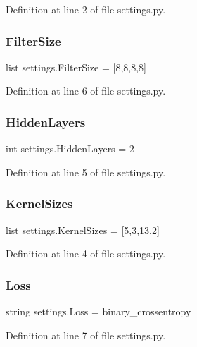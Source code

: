 Definition at line 2 of file settings.\+py.

\mbox{\label{namespacesettings_ad32069497b7acd7e985c078d77f29cea}} 
\subsubsection{Filter\+Size}
{\footnotesize\ttfamily list settings.\+Filter\+Size = [8,8,8,8]}



Definition at line 6 of file settings.\+py.

\mbox{\label{namespacesettings_a7ab30b36eb4de4ee4d8bd3d762061d03}} 
\subsubsection{Hidden\+Layers}
{\footnotesize\ttfamily int settings.\+Hidden\+Layers = 2}



Definition at line 5 of file settings.\+py.

\mbox{\label{namespacesettings_a08ce7efcff1b67c3adc53a438a6c20e0}} 
\subsubsection{Kernel\+Sizes}
{\footnotesize\ttfamily list settings.\+Kernel\+Sizes = [5,3,13,2]}



Definition at line 4 of file settings.\+py.

\mbox{\label{namespacesettings_a7a8c06359c925c3df63368c34df557b2}} 
\subsubsection{Loss}
{\footnotesize\ttfamily string settings.\+Loss = \textquotesingle{}binary\+\_\+crossentropy\textquotesingle{}}



Definition at line 7 of file settings.\+py.

\mbox{\label{namespacesettings_a65f620a88c1a546e121d9afb79c19ec9}} 

